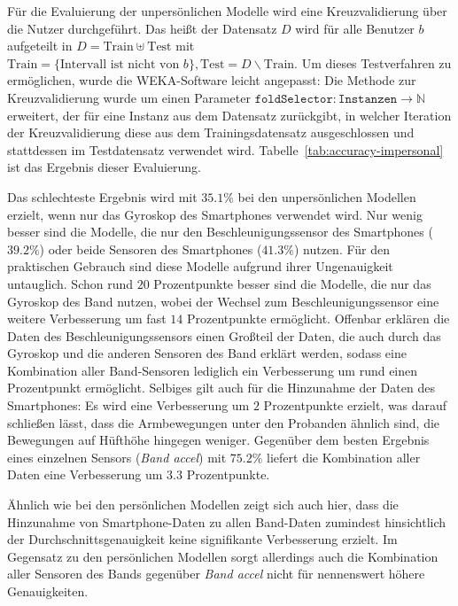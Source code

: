 Für die Evaluierung der unpersönlichen Modelle wird eine Kreuzvalidierung über die Nutzer durchgeführt. Das heißt der Datensatz $D$ wird für alle Benutzer $b$ aufgeteilt in $D = \text{Train} \uplus \text{Test}$ mit $\text{Train} = \{\text{Intervall ist nicht von } b\}, \text{Test} = D \backslash \text{Train}$. Um dieses Testverfahren zu ermöglichen, wurde die WEKA-Software leicht angepasst: Die Methode zur Kreuzvalidierung wurde um einen Parameter $\texttt{foldSelector}: \texttt{Instanzen} \to \mathbb{N}$ erweitert, der für eine Instanz aus dem Datensatz zurückgibt, in welcher Iteration der Kreuzvalidierung diese aus dem Trainingsdatensatz ausgeschlossen und stattdessen im Testdatensatz verwendet wird. Tabelle~\ref{tab:accuracy-impersonal} ist das Ergebnis dieser Evaluierung.

Das schlechteste Ergebnis wird mit $35.1 \%$ bei den unpersönlichen Modellen erzielt, wenn nur das Gyroskop des Smartphones verwendet wird. Nur wenig besser sind die Modelle, die nur den Beschleunigungssensor des Smartphones ($39.2 \%$) oder beide Sensoren des Smartphones ($41.3 \%$) nutzen. Für den praktischen Gebrauch sind diese Modelle aufgrund ihrer Ungenauigkeit untauglich. Schon rund $20 $ Prozentpunkte besser sind die Modelle, die nur das Gyroskop des Band nutzen, wobei der Wechsel zum Beschleunigungssensor eine weitere Verbesserung um fast $14$ Prozentpunkte ermöglicht. Offenbar erklären die Daten des Beschleunigungssensors einen Großteil der Daten, die auch durch das Gyroskop und die anderen Sensoren des Band erklärt werden, sodass eine Kombination aller Band-Sensoren lediglich ein Verbesserung um rund einen Prozentpunkt ermöglicht. Selbiges gilt auch für die Hinzunahme der Daten des Smartphones: Es wird eine Verbesserung um $2$ Prozentpunkte erzielt, was darauf schließen lässt, dass die Armbewegungen unter den Probanden ähnlich sind, die Bewegungen auf Hüfthöhe hingegen weniger. Gegenüber dem besten Ergebnis eines einzelnen Sensors (\textit{Band accel}) mit $75.2 \%$ liefert die Kombination aller Daten eine Verbesserung um $3.3$ Prozentpunkte.

Ähnlich wie bei den persönlichen Modellen zeigt sich auch hier, dass die Hinzunahme von Smartphone-Daten zu allen Band-Daten zumindest hinsichtlich der Durchschnittsgenauigkeit keine signifikante Verbesserung erzielt. Im Gegensatz zu den persönlichen Modellen sorgt allerdings auch die Kombination aller Sensoren des Bands gegenüber \textit{Band accel} nicht für nennenswert höhere Genauigkeiten.

